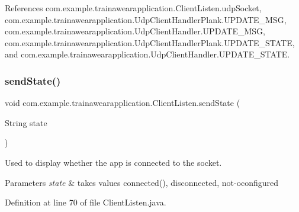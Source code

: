 References com.\+example.\+trainawearapplication.\+Client\+Listen.\+udp\+Socket, com.\+example.\+trainawearapplication.\+Udp\+Client\+Handler\+Plank.\+U\+P\+D\+A\+T\+E\+\_\+\+M\+SG, com.\+example.\+trainawearapplication.\+Udp\+Client\+Handler.\+U\+P\+D\+A\+T\+E\+\_\+\+M\+SG, com.\+example.\+trainawearapplication.\+Udp\+Client\+Handler\+Plank.\+U\+P\+D\+A\+T\+E\+\_\+\+S\+T\+A\+TE, and com.\+example.\+trainawearapplication.\+Udp\+Client\+Handler.\+U\+P\+D\+A\+T\+E\+\_\+\+S\+T\+A\+TE.

\mbox{\label{classcom_1_1example_1_1trainawearapplication_1_1_client_listen_ab1d26a5c46561734eef258d64a6d7723}} 
\subsubsection{\texorpdfstring{sendState()}{sendState()}}
{\footnotesize\ttfamily void com.\+example.\+trainawearapplication.\+Client\+Listen.\+send\+State (\begin{DoxyParamCaption}\item[{String}]{state }\end{DoxyParamCaption})\hspace{0.3cm}{\ttfamily [private]}}



Used to display whether the app is connected to the socket. 


\begin{DoxyParams}{Parameters}
{\em state} & takes values connected(), disconnected, not-\/oconfigured \\
\hline
\end{DoxyParams}


Definition at line 70 of file Client\+Listen.\+java.


\begin{DoxyCode}{0}

\end{DoxyCode}


